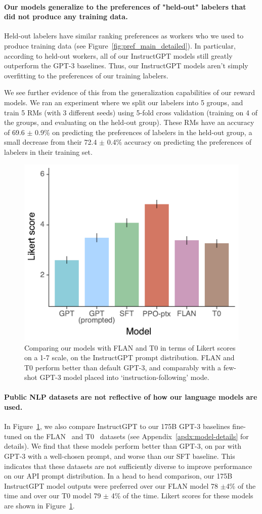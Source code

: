 \documentclass{article}
\begin{document}
\paragraph{Our models generalize to the preferences of "held-out" labelers that did not produce any training data.} Held-out labelers have similar ranking preferences as workers who we used to produce training data (see Figure~\ref{fig:pref_main_detailed}). In particular, according to held-out workers, all of our InstructGPT models still greatly outperform the GPT-3 baselines. Thus, our InstructGPT models aren't simply overfitting to the preferences of our training labelers.

We see further evidence of this from the generalization capabilities of our reward models. We ran an experiment where we split our labelers into 5 groups,
and train 5 RMs (with 3 different seeds) using 5-fold cross validation (training on 4 of the groups, and evaluating on the held-out group).
These RMs have an accuracy of 69.6 $\pm$ 0.9\% on predicting the preferences of labelers in the held-out group, a small decrease from their 72.4 $\pm$ 0.4\% accuracy on predicting the preferences of labelers in their training set.

\begin{figure}[t]
    \centering
    \includegraphics[width=0.5\linewidth]{figs/flan-t0-lik.pdf}
    \caption{Comparing our models with FLAN and T0 in terms of Likert scores on a 1-7 scale, on the InstructGPT prompt distribution. FLAN and T0 perform better than default GPT-3, and comparably with a few-shot GPT-3 model placed into `instruction-following' mode.}
    \label{fig:flan-t0-lik}
\end{figure}

\paragraph{Public NLP datasets are not reflective of how our language models are used.} In Figure~\ref{fig:flan-t0-lik}, we also compare InstructGPT to our 175B GPT-3 baselines fine-tuned on the FLAN~\citep{wei2021finetuned} and T0~\citep{sanh2021multitask} datasets (see Appendix~\ref{apdx:model-details} for details). We find that these models perform better than GPT-3, on par with GPT-3 with a well-chosen prompt, and worse than our SFT baseline. This indicates that these datasets are not sufficiently diverse to improve performance on our API prompt distribution. In a head to head comparison, our 175B InstructGPT model outputs were preferred over our FLAN model 78 $\pm$4\% of the time and over our T0 model 79 $\pm$ 4\% of the time. Likert scores for these models are shown in Figure~\ref{fig:flan-t0-lik}.
\end{document}
